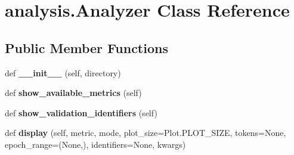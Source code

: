 \hypertarget{classanalysis_1_1Analyzer}{}\section{analysis.\+Analyzer Class Reference}
\label{classanalysis_1_1Analyzer}
\subsection*{Public Member Functions}
\begin{DoxyCompactItemize}
\item 
def {\bfseries \+\_\+\+\_\+init\+\_\+\+\_\+} (self, directory)\hypertarget{classanalysis_1_1Analyzer_a31ea6d2257834ac6334c9a2896b58e96}{}\label{classanalysis_1_1Analyzer_a31ea6d2257834ac6334c9a2896b58e96}

\item 
def {\bfseries show\+\_\+available\+\_\+metrics} (self)\hypertarget{classanalysis_1_1Analyzer_a694a48d9f544ee44dd8574479dad19bf}{}\label{classanalysis_1_1Analyzer_a694a48d9f544ee44dd8574479dad19bf}

\item 
def {\bfseries show\+\_\+validation\+\_\+identifiers} (self)\hypertarget{classanalysis_1_1Analyzer_a4026317b5faf8c89dcf4921c3ab3b630}{}\label{classanalysis_1_1Analyzer_a4026317b5faf8c89dcf4921c3ab3b630}

\item 
def {\bfseries display} (self, metric, mode, plot\+\_\+size=Plot.\+P\+L\+O\+T\+\_\+\+S\+I\+ZE, tokens=None, epoch\+\_\+range=(None,), identifiers=None, kwargs)\hypertarget{classanalysis_1_1Analyzer_a0d170e69cc1a1507411a665873d40cd1}{}\label{classanalysis_1_1Analyzer_a0d170e69cc1a1507411a665873d40cd1}

\end{DoxyCompactItemize}
